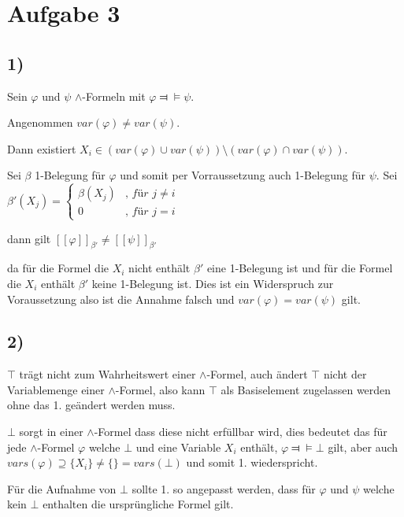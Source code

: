 \section*{Aufgabe 3}

\subsection*{1)}

Sein $\varphi$ und $\psi$ $\wedge$-Formeln mit $\varphi \Dashv \vDash \psi$.

Angenommen $var(\varphi) \neq var(\psi).$

Dann existiert $X_i \in (var(\varphi) \cup var(\psi)) \setminus (var(\varphi) \cap var(\psi))$.

Sei $\beta$ 1-Belegung für $\varphi$ und somit per Vorraussetzung auch 1-Belegung für $\psi$.
Sei $\beta'(X_j) = \begin{cases}
	\beta(X_j) &\textit{, für } j \neq i \\
	0		  &\textit{, für } j = i
	\end{cases}
$ 

dann gilt $[\![\varphi]\!]_{\beta'} \neq [\![\psi]\!]_{\beta'}$

da für die Formel die $X_i$ nicht enthält $\beta'$ eine 1-Belegung ist und für die Formel die $X_i$ enthält $\beta'$ keine 1-Belegung ist. 
Dies ist ein Widerspruch zur Voraussetzung also ist die Annahme falsch und $var(\varphi)=var(\psi)$ gilt.




\subsection*{2)}

$\top$ trägt nicht zum Wahrheitswert einer $\wedge$-Formel,
 auch ändert $\top$ nicht der Variablemenge einer $\wedge$-Formel,
 also kann $\top$ als Basiselement zugelassen werden ohne das 1. geändert werden muss.

$\bot$ sorgt in einer $\wedge$-Formel dass diese nicht erfüllbar wird,
dies bedeutet das für jede $\wedge$-Formel $\varphi$ welche $\bot$ und eine Variable $X_i$ enthält,
 $\varphi \Dashv \vDash \bot$  gilt, aber auch $vars(\varphi) \supseteq \{X_i\} \neq \{\} = vars(\bot)$ und somit 1. wiederspricht.
 
Für die Aufnahme von $\bot$ sollte 1. so angepasst werden, 
	dass für $\varphi$ und $\psi$ welche kein $\bot$ enthalten die ursprüngliche Formel gilt.
	